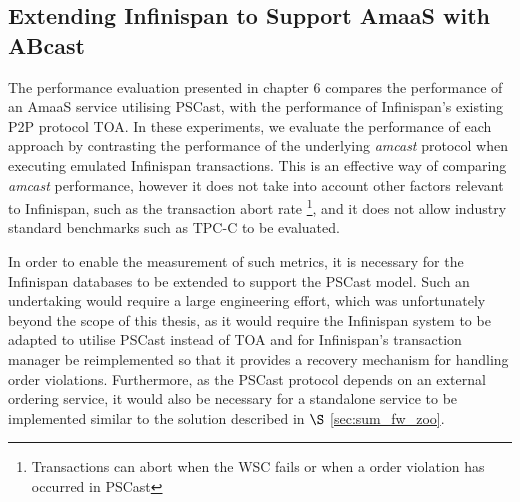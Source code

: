     \subsection{Extending Infinispan to Support AmaaS with ABcast}
    The performance evaluation presented in chapter 6 compares the performance of an \textsf{AmaaS} service utilising \textsf{PSCast}, with the performance of Infinispan's existing P2P protocol TOA.  In these experiments, we evaluate the performance of each approach by contrasting the performance of the underlying \emph{amcast} protocol when executing emulated Infinispan transactions.  This is an effective way of comparing \emph{amcast} performance, however it does not take into account other factors relevant to Infinispan, such as the transaction abort rate \footnote{Transactions can abort when the WSC fails or when a order violation has occurred in \textsf{PSCast}}, and it does not allow industry standard benchmarks such as TPC-C \citep{TPC-C} to be evaluated.  
    
    In order to enable the measurement of such metrics, it is necessary for the Infinispan databases to be extended to support the \textsf{PSCast} model.  Such an undertaking would require a large engineering effort, which was unfortunately beyond the scope of this thesis, as it would require the Infinispan system to be adapted to utilise \textsf{PSCast} instead of \textsf{TOA} and for Infinispan's transaction manager be reimplemented so that it provides a recovery mechanism for handling order violations.  Furthermore, as the \textsf{PSCast} protocol depends on an external ordering service, it would also be necessary for a standalone service to be implemented similar to the solution described in $\S$ \ref{sec:sum_fw_zoo}.  